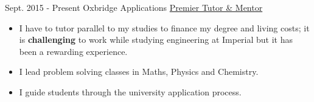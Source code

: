 \documentclass[letterpaper]{twentysecondcv} %
\begin{document}
\begin{twenty}
    \twentyitem
        {Sept. 2015 - }
        {Present}
        {Oxbridge Applications}
        {\href{http://www.oxbridgeapplications.com}{Premier Tutor \& Mentor}}
        {}
        {\vspace{-1mm} \begin{itemize}
            \item I have to tutor parallel to my studies to finance my degree and living costs; it is \textbf{challenging} to work while studying engineering at Imperial but it has been a rewarding experience. 
            \item I lead problem solving classes in Maths, Physics and Chemistry.
            \item I guide students through the university application process.
        \end{itemize}}
\end{twenty}


\end{document}
